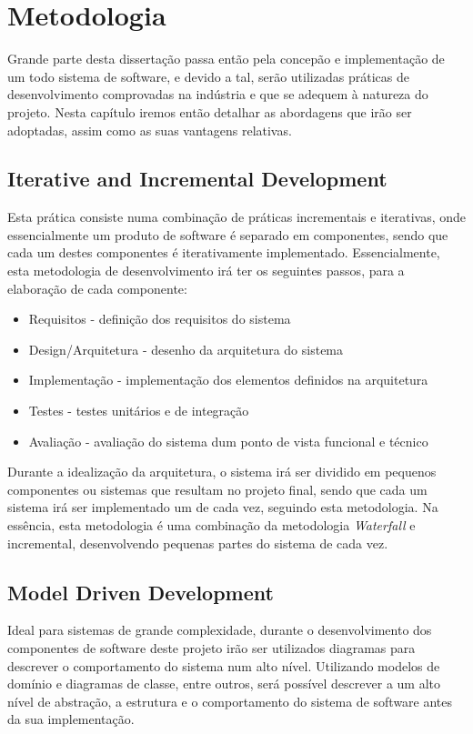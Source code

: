 \chapter{Metodologia}

Grande parte desta dissertação passa então pela concepão e implementação de um todo sistema de software, e devido a tal, serão utilizadas práticas de desenvolvimento comprovadas na indústria e que se adequem à natureza do projeto. Nesta capítulo iremos então detalhar as abordagens que irão ser adoptadas, assim como as suas vantagens relativas.

\section{Iterative and Incremental Development}

Esta prática consiste numa combinação de práticas incrementais e iterativas, onde essencialmente um produto de software é separado em componentes, sendo que cada um destes componentes é iterativamente implementado. Essencialmente, esta metodologia de desenvolvimento irá ter os seguintes passos, para a elaboração de cada componente:
\begin{itemize}
    \item Requisitos - definição dos requisitos do sistema
    \item Design/Arquitetura - desenho da arquitetura do sistema
    \item Implementação - implementação dos elementos definidos na arquitetura
    \item Testes - testes unitários e de integração
    \item Avaliação - avaliação do sistema dum ponto de vista funcional e técnico
\end{itemize}

Durante a idealização da arquitetura, o sistema irá ser dividido em pequenos componentes ou sistemas que resultam no projeto final, sendo que cada um sistema irá ser implementado um de cada vez, seguindo esta metodologia. Na essência, esta metodologia é uma combinação da metodologia \textit{Waterfall} e incremental, desenvolvendo pequenas partes do sistema de cada vez.

\section{Model Driven Development}

Ideal para sistemas de grande complexidade, durante o desenvolvimento dos componentes de software deste projeto irão ser utilizados diagramas para descrever o comportamento do sistema num alto nível. Utilizando modelos de domínio e diagramas de classe, entre outros, será possível descrever a um alto nível de abstração, a estrutura e o comportamento do sistema de software antes da sua implementação.

